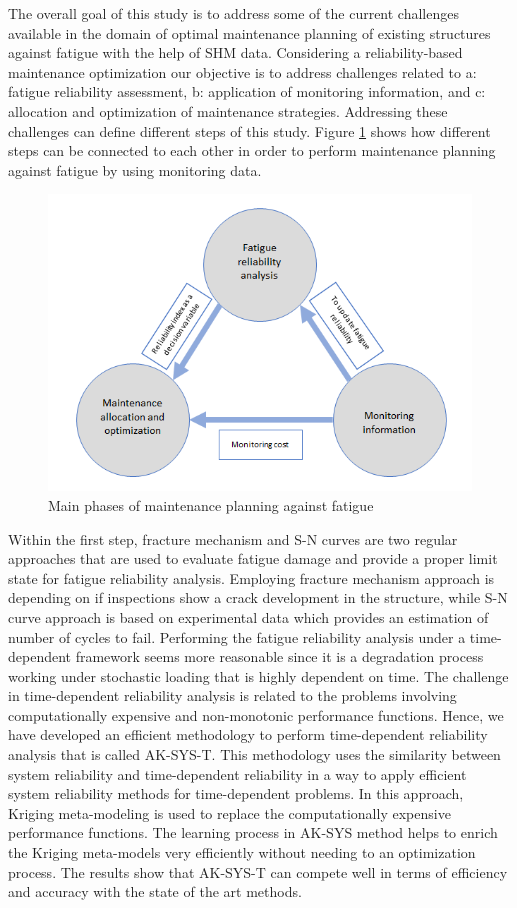 \noindent
The overall goal of this study is to address some of the current challenges available in the domain of optimal maintenance planning of existing structures against fatigue with the help of 
\ac{SHM} data. Considering a reliability-based maintenance optimization our objective is to address challenges related to a: fatigue reliability assessment, b: application of monitoring 
information, and c: allocation and optimization of maintenance strategies. Addressing these challenges can define different steps of this study. Figure \ref{fig:phases} shows how different 
steps can be connected to each other in order to perform maintenance planning against fatigue by using monitoring data. 

\begin{figure}[ht]
\centering
  \includegraphics[width=0.75\linewidth]{figures/steps_flow.png}
  \caption{Main phases of maintenance planning against fatigue}
  \label{fig:phases}
\end{figure}


Within the first step, fracture mechanism and S-N curves are two regular approaches that are used to evaluate fatigue damage and provide a proper limit state for fatigue reliability analysis. 
Employing fracture mechanism approach is depending on if inspections show a crack development in the structure, while S-N curve approach is based on experimental data which provides an estimation 
of number of cycles to fail. Performing the fatigue reliability analysis under a time-dependent framework seems more reasonable since it is a degradation process working under stochastic
loading that is highly dependent on time. The challenge in time-dependent reliability analysis is related to the problems involving computationally expensive and non-monotonic performance 
functions. Hence, we have developed an efficient methodology to perform time-dependent reliability analysis that is called AK-SYS-T. This methodology uses the similarity between system 
reliability and time-dependent reliability in a way to apply efficient system reliability methods for time-dependent problems. In this approach, Kriging meta-modeling is used to replace the 
computationally expensive performance functions. The learning process in AK-SYS method helps to enrich the Kriging meta-models very efficiently without needing to an optimization process.
The results show that AK-SYS-T can compete well in terms of efficiency and accuracy with the state of the art methods.


